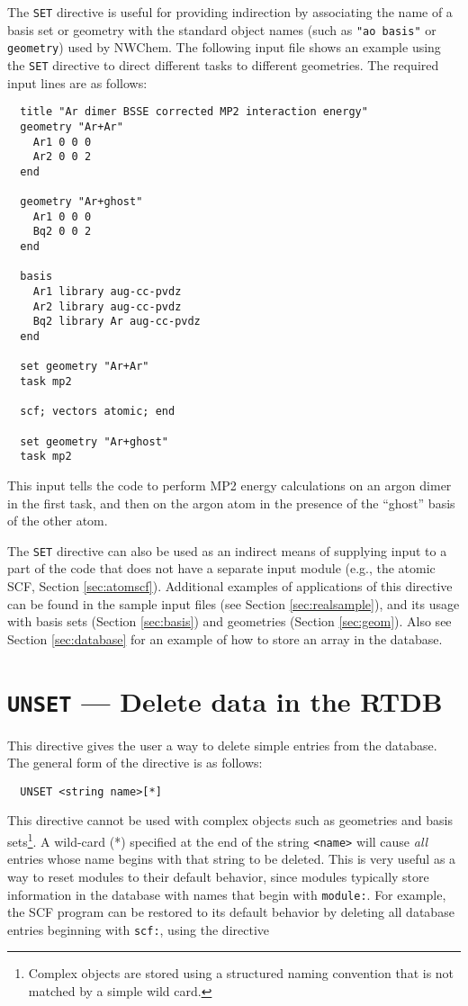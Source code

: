 The \verb+SET+ directive is useful for providing indirection by
associating the name of a basis set or geometry with the standard
object names (such as \verb+"ao basis"+ or \verb+geometry+) used by
NWChem.  The following input file shows an example using the
\verb+SET+ directive to direct different tasks to different
geometries.  The required input lines are as follows:

\begin{verbatim}
  title "Ar dimer BSSE corrected MP2 interaction energy"
  geometry "Ar+Ar"
    Ar1 0 0 0
    Ar2 0 0 2
  end

  geometry "Ar+ghost"
    Ar1 0 0 0
    Bq2 0 0 2
  end

  basis
    Ar1 library aug-cc-pvdz
    Ar2 library aug-cc-pvdz
    Bq2 library Ar aug-cc-pvdz
  end

  set geometry "Ar+Ar"
  task mp2 

  scf; vectors atomic; end

  set geometry "Ar+ghost"
  task mp2 
\end{verbatim}

This input tells the code to perform MP2 energy calculations 
on an argon dimer in the first task, and then
on the argon atom in the presence of the ``ghost'' basis of the other
atom.

The \verb+SET+ directive can also be used as an indirect means of
supplying input to a part of the code that does not have a separate
input module (e.g., the atomic SCF, Section \ref{sec:atomscf}).
Additional examples of applications of this directive can be found in
the sample input files (see Section \ref{sec:realsample}), and
its usage with basis sets (Section \ref{sec:basis}) and geometries
(Section \ref{sec:geom}). Also see Section \ref{sec:database} for
an example of how to store an array in the database.

\section{{\tt UNSET} --- Delete data in the RTDB}
\label{sec:unset}

This directive gives the user a way to delete simple entries from the
database.  The general form of the directive is as follows:

\begin{verbatim}
  UNSET <string name>[*]
\end{verbatim}

This directive cannot be used with complex objects such as geometries
and basis sets\footnote{Complex objects are stored using a structured
  naming convention that is not matched by a simple wild card.}.  A
wild-card (*) specified at the end of the string \verb+<name>+ will
cause {\em all} entries whose name begins with that string to be
deleted.  This is very useful as a way to reset modules to their
default behavior, since modules typically store information in the
database with names that begin with \verb+module:+.  For example, the
SCF program can be restored to its default behavior by deleting all
database entries beginning with \verb+scf:+, using the directive

